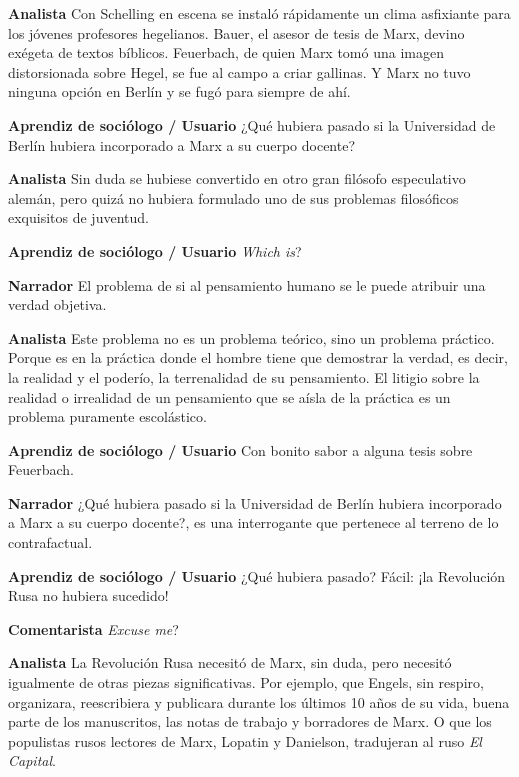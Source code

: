 \documentclass[
  spanish,
  11pt,
  a4paper,
]{scrbook}
\newenvironment{transcripcion}{
    \begin{list}{}{
        \setlength{\leftmargin}{1.5em}  %
        \setlength{\rightmargin}{0em}
        \setlength{\itemsep}{0.2em}     %
        \setlength{\parsep}{0.0em}
        \setlength{\listparindent}{0pt}
    }
}{
    \end{list}
}
\newcommand{\personaje}[1]{\textbf{#1}\quad}
\begin{document}
\begin{transcripcion}
\item \personaje{Analista} Con Schelling en escena se instaló rápidamente un clima asfixiante para los jóvenes profesores hegelianos. Bauer, el asesor de tesis de Marx, devino exégeta de textos bíblicos. Feuerbach, de quien Marx tomó una imagen distorsionada sobre Hegel, se fue al campo a criar gallinas. Y Marx no tuvo ninguna opción en Berlín y se fugó para siempre de ahí.

\item \personaje{Aprendiz de sociólogo / Usuario} ¿Qué hubiera pasado si la Universidad de Berlín hubiera incorporado a Marx a su cuerpo docente?

\item \personaje{Analista} Sin duda se hubiese convertido en otro gran filósofo especulativo alemán, pero quizá no hubiera formulado uno de sus problemas filosóficos exquisitos de juventud.

\item \personaje{Aprendiz de sociólogo / Usuario} \textit{Which is}?

\item \personaje{Narrador} El problema de si al pensamiento humano se le puede atribuir una verdad objetiva.

\item \personaje{Analista} Este problema no es un problema teórico, sino un problema práctico. Porque es en la práctica donde el hombre tiene que demostrar la verdad, es decir, la realidad y el poderío, la terrenalidad de su pensamiento. El litigio sobre la realidad o irrealidad de un pensamiento que se aísla de la práctica es un problema puramente escolástico.

\item \personaje{Aprendiz de sociólogo / Usuario} Con bonito sabor a alguna tesis sobre Feuerbach.

\item \personaje{Narrador} ¿Qué hubiera pasado si la Universidad de Berlín hubiera incorporado a Marx a su cuerpo docente?, es una interrogante que pertenece al terreno de lo contrafactual.

\item \personaje{Aprendiz de sociólogo / Usuario} ¿Qué hubiera pasado? Fácil: ¡la Revolución Rusa no hubiera sucedido!

\item \personaje{Comentarista} \textit{Excuse me}?

\item \personaje{Analista} La Revolución Rusa necesitó de Marx, sin duda, pero necesitó igualmente de otras piezas significativas. Por ejemplo, que Engels, sin respiro, organizara, reescribiera y publicara durante los últimos 10 años de su vida, buena parte de los manuscritos, las notas de trabajo y borradores de Marx. O que los populistas rusos lectores de Marx, Lopatin y Danielson, tradujeran al ruso \textit{El Capital}.


\end{transcripcion}
\end{document}
